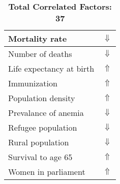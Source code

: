 \documentclass[12pt,notitlepage,oneside]{report}
\begin{document}
\begin{table}[!htb]
\begin{tabular}{|l|l|}
Mortality rate & $\Downarrow$\\ \hline
Number of deaths & $\Downarrow$\\ \hline
Life expectancy at birth & $\Uparrow$\\ \hline
Immunization & $\Uparrow$\\ \hline
Population density & $\Uparrow$\\ \hline
Prevalance of anemia & $\Downarrow$\\ \hline
Refugee population & $\Downarrow$\\ \hline
Rural population & $\Downarrow$\\ \hline
Survival to age 65 & $\Uparrow$\\ \hline
Women in parliament & $\Uparrow$\\ \hline
\end{tabular}
\caption*{\textbf{Total Correlated Factors: 37}}
\end{table}
\clearpage
\end{document}

